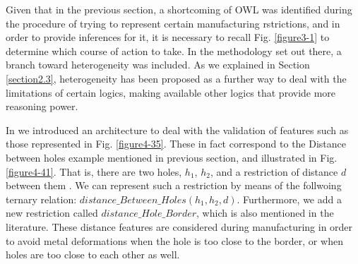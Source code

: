 Given that in the previous section, a shortcoming of OWL was identified during the procedure of trying to represent certain manufacturing rstrictions, and in order to provide inferences for it, it is necessary to recall  Fig. \ref{figure3-1} to determine which course of action to take. In the methodology set out there, a branch toward heterogeneity was included. As we explained in Section \ref{section2.3}, heterogeneity has been proposed as a further way to deal with the limitations of certain logics, making available other logics that provide more reasoning power.


\cbstart In \cite{ramos_hetereogeneous_2012}   we introduced an architecture to deal with the validation of features such as those represented in Fig. \ref{figure4-35}. These in fact correspond to the Distance between holes example mentioned in previous section, and illustrated in Fig. \ref{figure4-41}. That is, there are two holes, $h_{1}$, $h_{2}$, and a restriction of distance $d$ between them . We can represent such a restriction by means of the follwoing ternary relation: $distance\_Between\_Holes(h_{1},h_{2},d)$.  Furthermore, we add a new restriction   called $distance\_Hole\_Border$, which is also mentioned in the literature. These distance features are considered during manufacturing in order to avoid metal deformations when the hole is too close to the border, or when holes are too close to each other as well. \cbend 


